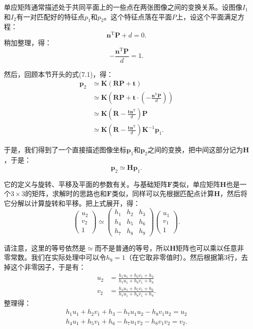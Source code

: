 单应矩阵通常描述处于共同平面上的一些点在两张图像之间的变换关系。设图像$I_{1}$和$I_{2}$有一对匹配好的特征点$p_{1}$和$p_{2}$。这个特征点落在平面$P$上，设这个平面满足方程：
\begin{equation}
\bm{n}^\mathrm{T} \bm{P} + d = 0.
\end{equation}
稍加整理，得：
\begin{equation}
- \frac{\bm{n}^\mathrm{T} \bm{P} }{d} = 1.
\end{equation}

然后，回顾本节开头的式(7.1)，得：
\begin{align*}
\bm{p}_2 &\simeq \bm{K} ( \bm{R} \bm{P} + \bm{t} ) \\ 
&\simeq \bm{K} \left( \bm{R} \bm{P} + \bm{t} \cdot (- \frac{\bm{n}^\mathrm{T} \bm{P} }{d}) \right) \\
&\simeq \bm{K} \left( \bm{R} - \frac{\bm{t} \bm{n}^\mathrm{T} }{d} \right) \bm{P} \\ 
&\simeq \bm{K} \left( \bm{R} - \frac{\bm{t} \bm{n}^\mathrm{T} }{d} \right) \bm{K}^{-1} \bm{p}_1.
\end{align*}

于是，我们得到了一个直接描述图像坐标$\bm{p}_1$和$\bm{p}_2$之间的变换，把中间这部分记为$\bm{H}$，于是：
\begin{equation}
\bm{p}_2 \simeq \bm{H} \bm{p}_1.
\end{equation}

它的定义与旋转、平移及平面的参数有关。与基础矩阵$\bm{F}$类似，单应矩阵$\bm{H}$也是一个$3 \times 3$的矩阵，求解时的思路也和$\bm{F}$类似，同样可以先根据匹配点计算$\bm{H}$，然后将它分解以计算旋转和平移。把上式展开，得：
\begin{equation}
\begin{pmatrix} 
u_{2}\\v_{2}\\1
\end{pmatrix}
\simeq
\begin{pmatrix}
 h_{1} & h_{2} & h_{3}\\ 
 h_{4} & h_{5} & h_{6}\\ 
 h_{7} & h_{8} & h_{9} 
\end{pmatrix}
\begin{pmatrix} 
u_{1}\\v_{1}\\1
\end{pmatrix}.
\end{equation}

请注意，这里的等号依然是$\simeq$而不是普通的等号，所以$\bm{H}$矩阵也可以乘以任意非零常数。我们在实际处理中可以令$h_9 = 1$（在它取非零值时）。然后根据第3行，去掉这个非零因子，于是有：
\[
\begin{aligned}
u_{2}&=\frac{h_{1}u_{1}+h_{2}v_{1}+h_{3}}{h_{7}u_{1}+h_{8}v_{1}+h_{9}}\\
v_{2}&=\frac{h_{4}u_{1}+h_{5}v_{1}+h_{6}}{h_{7}u_{1}+h_{8}v_{1}+h_{9}}.
\end{aligned}
\]
整理得：
\[
\begin{gathered}
h_{1}u_{1}+h_{2}v_{1}+h_{3}-h_{7}u_{1}u_{2}-h_{8}v_{1}u_{2}=u_{2}\\
h_{4}u_{1}+h_{5}v_{1}+h_{6}-h_{7}u_{1}v_{2}-h_{8}v_{1}v_{2}=v_{2}.
\end{gathered}
\]

